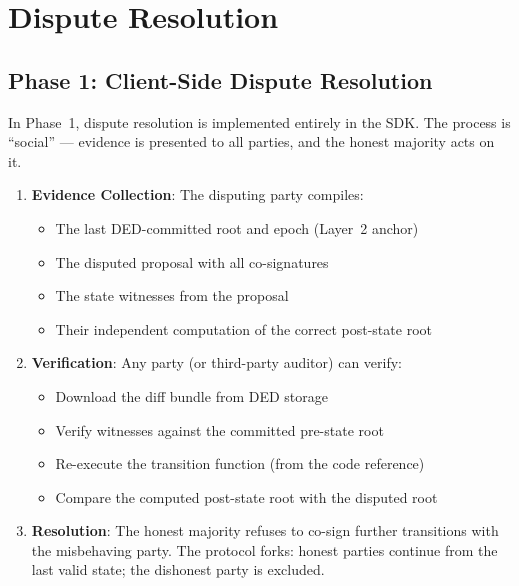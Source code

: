 \documentclass[11pt,a4paper]{article}
\begin{document}
\section{Dispute Resolution}
\label{sec:disputes}

\subsection{Phase 1: Client-Side Dispute Resolution}

In Phase~1, dispute resolution is implemented entirely in the SDK. The process
is ``social'' --- evidence is presented to all parties, and the honest
majority acts on it.

\begin{enumerate}[nosep]
  \item \textbf{Evidence Collection}: The disputing party compiles:
    \begin{itemize}[nosep]
      \item The last DED-committed root and epoch (Layer~2 anchor)
      \item The disputed proposal with all co-signatures
      \item The state witnesses from the proposal
      \item Their independent computation of the correct post-state root
    \end{itemize}

  \item \textbf{Verification}: Any party (or third-party auditor) can verify:
    \begin{itemize}[nosep]
      \item Download the diff bundle from DED storage
      \item Verify witnesses against the committed pre-state root
      \item Re-execute the transition function (from the code reference)
      \item Compare the computed post-state root with the disputed root
    \end{itemize}

  \item \textbf{Resolution}: The honest majority refuses to co-sign further
    transitions with the misbehaving party. The protocol forks: honest parties
    continue from the last valid state; the dishonest party is excluded.
\end{enumerate}
\end{document}
